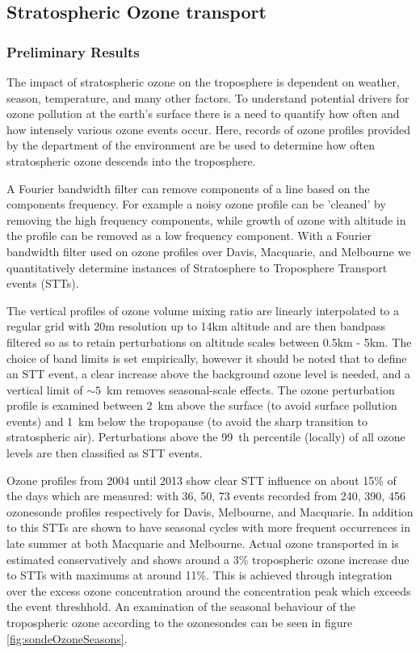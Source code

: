 \subsection{Stratospheric Ozone transport}
\subsubsection{Preliminary Results}
The impact of stratospheric ozone on the troposphere is dependent on weather, season, temperature, and many other factors.
To understand potential drivers for ozone pollution at the earth's surface there is a need to quantify how often and how intensely various ozone events occur.
Here, records of ozone profiles provided by the department of the environment are be used to determine how often stratospheric ozone descends into the troposphere.

A Fourier bandwidth filter can remove components of a line based on the components frequency.
For example a noisy ozone profile can be 'cleaned' by removing the high frequency components, while growth of ozone with altitude in the profile can be removed as a low frequency component. 
With a Fourier bandwidth filter used on ozone profiles over Davis, Macquarie, and Melbourne we quantitatively determine instances of Stratosphere to Troposphere Transport events (STTs).

The vertical profiles of ozone volume mixing ratio are linearly interpolated to a regular grid with 20m resolution up to 14km altitude and are then bandpass filtered so as to retain perturbations on altitude scales between 0.5km - 5km. 
The choice of band limits is set empirically, however it should be noted that to define an STT event, a clear increase above the background ozone level is needed, and a vertical limit of $\sim 5$~km removes seasonal-scale effects. 
The ozone perturbation profile is examined between 2~km above the surface (to avoid surface pollution events) and 1~km below the tropopause (to avoid the sharp transition to stratospheric air).
Perturbations above the 99~th percentile (locally) of all ozone levels are then classified as STT events.

Ozone profiles from 2004 until 2013 show clear STT influence on about 15\% of the days which are measured: with 36, 50, 73 events recorded from 240, 390, 456 ozonesonde profiles respectively for Davis, Melbourne, and Macquarie.
In addition to this STTs are shown to have seasonal cycles with more frequent occurrences in late summer at both Macquarie and Melbourne.
Actual ozone transported in is estimated conservatively and shows around a 3\% tropospheric ozone increase due to STTs with maximums at around 11\%.
This is achieved through integration over the excess ozone concentration around the concentration peak which exceeds the event threshhold. 
An examination of the seasonal behaviour of the tropospheric ozone according to the ozonesondes can be seen in figure \ref{fig:sondeOzoneSeasons}.


